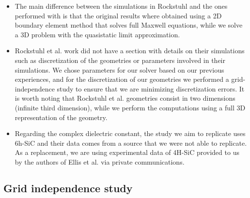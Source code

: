 \begin{itemize}

\item {The main difference between the simulations in Rockstuhl and the ones performed with \pygbe is that the original results where obtained 
using a 2D boundary element method that solves full Maxwell equations, while we solve a 3D problem with the quasistatic limit approximation.}

\item{ Rockstuhl et al. work did not have a section with details on their simulations such as discretization of the geometries or parameters 
involved in their simulations. We chose parameters for our solver based on our previous experiences, and for the discretization of our 
geometries we performed a grid-independence study to ensure that we are minimizing discretization errors. It is worth noting that Rockstuhl
et al. geometries consist in two dimensions (infinite third dimension), while we perform the computations using a full 3D representation of the geometry.} 

\item {Regarding the complex dielectric constant, the study we aim to replicate uses 6h-SiC and their data comes from a source that we were not able
to replicate. As a replacement, we are using experimental data of 4H-SiC provided to us by the authors of Ellis et al. \cite{ellis2016} via 
private communications.}

\end{itemize}

\subsection{Grid independence study} \label{ssec:grid_indep_rock}

